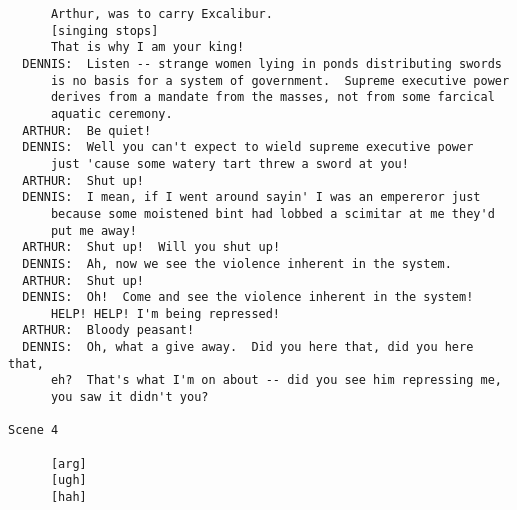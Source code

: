 \documentclass{article}
\begin{document}
\begin{verbatim}
      Arthur, was to carry Excalibur.
      [singing stops]
      That is why I am your king!
  DENNIS:  Listen -- strange women lying in ponds distributing swords
      is no basis for a system of government.  Supreme executive power
      derives from a mandate from the masses, not from some farcical
      aquatic ceremony.
  ARTHUR:  Be quiet!
  DENNIS:  Well you can't expect to wield supreme executive power
      just 'cause some watery tart threw a sword at you!
  ARTHUR:  Shut up!
  DENNIS:  I mean, if I went around sayin' I was an empereror just
      because some moistened bint had lobbed a scimitar at me they'd
      put me away!
  ARTHUR:  Shut up!  Will you shut up!
  DENNIS:  Ah, now we see the violence inherent in the system.
  ARTHUR:  Shut up!
  DENNIS:  Oh!  Come and see the violence inherent in the system!
      HELP! HELP! I'm being repressed!
  ARTHUR:  Bloody peasant!
  DENNIS:  Oh, what a give away.  Did you here that, did you here that,
      eh?  That's what I'm on about -- did you see him repressing me,
      you saw it didn't you?

Scene 4

      [arg]
      [ugh]
      [hah]


\end{verbatim}
\end{document}
